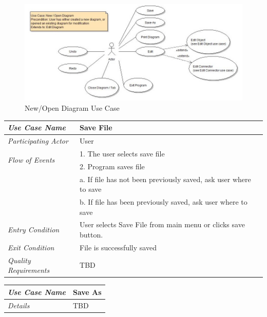 \documentclass[twoside,letterpaper]{article}
\begin{document}
\begin{figure}[h]
\centering
\includegraphics[width=6.0in]{ucaseNewOpenDiagram.jpg}
\caption{New/Open Diagram Use Case}
\end{figure}

\begin{flushleft}
\tablehead{}
\begin{tabular}{|m{2.0in} m{5.0in}|}
\hline
{\bfseries\emph{Use Case Name}}
& {\bfseries Save File}
\\\hline
\emph{Participating Actor}
& User
\\\hline
\multirow{2}{*}{\emph{Flow of Events}}
& 1. The user selects save file \\
& 2. Program saves file \\
& a. If file has not been previously saved, ask user where to save \\
& b. If file has been previously saved, ask user where to save
\\\hline
\emph{Entry Condition}
& User selects Save File from main menu or clicks save button.
\\\hline
\emph{Exit Condition}
& File is successfully saved
\\\hline
\emph{Quality Requirements}
& TBD
\\\hline
\end{tabular}
\end{flushleft}
\bigskip


\begin{flushleft}
\tablehead{}
\begin{tabular}{|m{2.0in} m{5.0in}|}
\hline
{\bfseries\emph{Use Case Name}}
& {\bfseries Save As}
\\\hline
\emph{Details}
& TBD
\\\hline
\end{tabular}
\end{flushleft}
\bigskip
\end{document}
